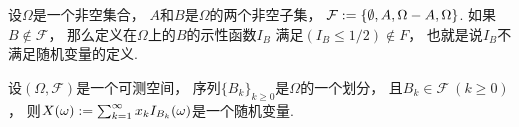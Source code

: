 \begin{example}
设\(\Omega\)是一个非空集合，
\(A\)和\(B\)是\(\Omega\)的两个非空子集，
\(\mathcal{F} := \{\emptyset,A,\Omega-A,\Omega\}\).
如果\(B \notin \mathcal{F}\)，
那么定义在\(\Omega\)上的\(B\)的示性函数\(I_B\)
满足\((I_B \leq 1/2) \notin F\)，
也就是说\(I_B\)不满足随机变量的定义.
\end{example}

\begin{example}
设\((\Omega,\mathcal{F})\)是一个可测空间，
序列\(\{B_k\}_{k\geq0}\)是\(\Omega\)的一个划分，
且\(B_k \in \mathcal{F}\ (k\geq0)\)，
则\(
	X(\omega) := \sum_{k=1}^\infty x_k I_{B_k}(\omega)
\)是一个随机变量.
\end{example}
